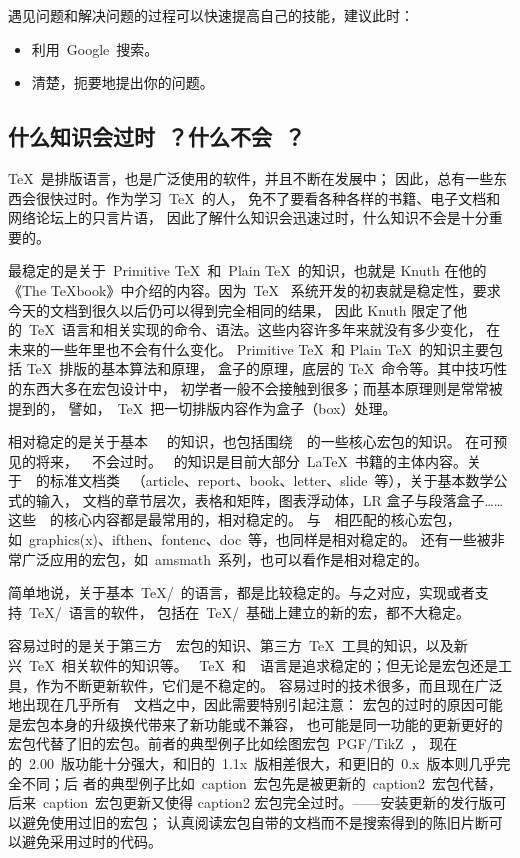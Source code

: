 遇见问题和解决问题的过程可以快速提高自己的技能，建议此时：
\begin{itemize}
  \item 利用~Google~搜索。
  \item 清楚，扼要地提出你的问题。
\end{itemize}

\subsection{什么知识会过时~？什么不会~？}

\TeX~是排版语言，也是广泛使用的软件，并且不断在发展中；
因此，总有一些东西会很快过时。作为学习~\TeX~的人，
免不了要看各种各样的书籍、电子文档和网络论坛上的只言片语，
因此了解什么知识会迅速过时，什么知识不会是十分重要的。

最稳定的是关于~Primitive \TeX~和~Plain \TeX~的知识，也就是 Knuth
在他的《The TeXbook》中介绍的内容。因为~\TeX~
系统开发的初衷就是稳定性，要求今天的文档到很久以后仍可以得到完全相同的结果，
因此 Knuth 限定了他的~\TeX~语言和相关实现的命令、语法。这些内容许多年来就没有多少变化，
在未来的一些年里也不会有什么变化。
Primitive \TeX~和 Plain \TeX~的知识主要包括 \TeX~排版的基本算法和原理，
盒子的原理，底层的 \TeX~命令等。其中技巧性的东西大多在宏包设计中，
初学者一般不会接触到很多；而基本原理则是常常被提到的，
譬如，~\TeX~把一切排版内容作为盒子（box）处理。

相对稳定的是关于基本~\LaTeXe~
的知识，也包括围绕~\LaTeXe~的一些核心宏包的知识。
在可预见的将来，~\LaTeXe~不会过时。
\LaTeXe~的知识是目前大部分~\LaTeX~书籍的主体内容。关于~\XeLaTeX~的标准文档类
~（article、report、book、letter、slide~等），关于基本数学公式的输入，
文档的章节层次，表格和矩阵，图表浮动体，LR 盒子与段落盒子……
这些~\XeLaTeX~的核心内容都是最常用的，相对稳定的。
与~\LaTeXe~相匹配的核心宏包，
如~graphics(x)、ifthen、fontenc、doc~等，也同样是相对稳定的。
还有一些被非常广泛应用的宏包，如~amsmath~系列，也可以看作是相对稳定的。

简单地说，关于基本~\TeX/\XeLaTeX~的语言，都是比较稳定的。与之对应，实现或者支持~\TeX/\XeLaTeX~语言的软件，
包括在~\TeX/\XeLaTeX~基础上建立的新的宏，都不大稳定。

容易过时的是关于第三方~\XeLaTeX~宏包的知识、第三方~\TeX~工具的知识，以及新兴~\TeX~相关软件的知识等。
~\TeX~和~\XeLaTeX~语言是追求稳定的；但无论是宏包还是工具，作为不断更新软件，它们是不稳定的。
容易过时的技术很多，而且现在广泛地出现在几乎所有~\XeLaTeX~文档之中，因此需要特别引起注意：
宏包的过时的原因可能是宏包本身的升级换代带来了新功能或不兼容，
也可能是同一功能的更新更好的宏包代替了旧的宏包。前者的典型例子比如绘图宏包~PGF/TikZ~，
现在的~2.00~版功能十分强大，和旧的~1.1x~版相差很大，和更旧的~0.x~版本则几乎完全不同；后
者的典型例子比如~caption~宏包先是被更新的~caption2~宏包代替，后来~caption~宏包更新又使得
caption2 宏包完全过时。——安装更新的发行版可以避免使用过旧的宏包；
认真阅读宏包自带的文档而不是搜索得到的陈旧片断可以避免采用过时的代码。

